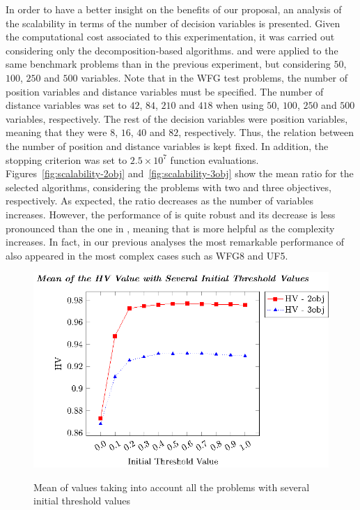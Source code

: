 In order to have a better insight on the benefits of our proposal, an analysis of the scalability in terms of the number 
of decision variables is presented.
%
Given the computational cost associated to this experimentation, it was carried out considering only 
the decomposition-based algorithms.
%
\AVSDMOEAD{} and \MOEADDE{} were applied to the same benchmark problems than in the previous experiment, 
but considering $50$, $100$, $250$ and $500$ variables.
%
Note that in the WFG test problems, the number of position variables and distance variables must be specified.
%
The number of distance variables was set to $42$, $84$, $210$ and $418$ when using $50$, $100$, $250$ and $500$ 
variables, respectively.
%
The rest of the decision variables were position variables, meaning that they were $8$, $16$, $40$ and $82$, respectively.
%
Thus, the relation between the number of position and distance variables is kept fixed.
%
In addition, the stopping criterion was set to $2.5 \times 10^7$ function evaluations.
%
Figures~\ref{fig:scalability-2obj} and~\ref{fig:scalability-3obj} show the mean \HV{} ratio for the selected algorithms, 
considering the problems with two and three objectives, respectively.
%
As expected, the \HV{} ratio decreases as the number of variables increases.
%
However, the performance of \AVSDMOEAD{} is quite robust and its decrease is less pronounced than the one in \MOEADDE{},
meaning that \AVSDMOEAD{} is more helpful as the complexity increases.
%
In fact, in our previous analyses the most remarkable performance of \AVSDMOEAD{} also appeared in the most complex cases such
as WFG8 and UF5.
%



\begin{figure}[t]
\centering
\includegraphics[scale=0.70]{images/Graphic-Initial-Distance_tikz-figure0.eps} \\
\caption{Mean of \HV{} values taking into account all the problems with several initial threshold values}\label{fig:Initial-distance-factor}
\end{figure}


